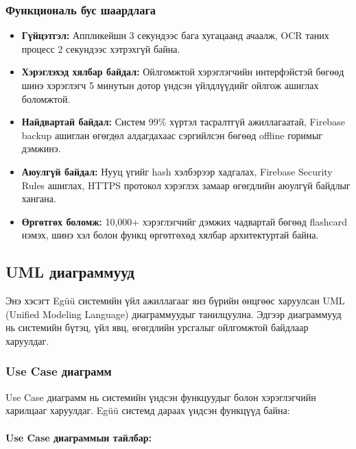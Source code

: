 \subsubsection{Функциональ бус шаардлага}

\begin{itemize}
\item \textbf{Гүйцэтгэл:} Аппликейшн 3 секундээс бага хугацаанд ачаалж, OCR таних процесс 2 секундээс хэтрэхгүй байна.

\item \textbf{Хэрэглэхэд хялбар байдал:} Ойлгомжтой хэрэглэгчийн интерфэйстэй бөгөөд шинэ хэрэглэгч 5 минутын дотор үндсэн үйлдлүүдийг ойлгож ашиглах боломжтой.

\item \textbf{Найдвартай байдал:} Систем 99\% хүртэл тасралтгүй ажиллагаатай, Firebase backup ашиглан өгөгдөл алдагдахаас сэргийлсэн бөгөөд offline горимыг дэмжинэ.

\item \textbf{Аюулгүй байдал:} Нууц үгийг hash хэлбэрээр хадгалах, Firebase Security Rules ашиглах, HTTPS протокол хэрэглэх замаар өгөгдлийн аюулгүй байдлыг хангана.

\item \textbf{Өргөтгөх боломж:} 10,000+ хэрэглэгчийг дэмжих чадвартай бөгөөд flashcard нэмэх, шинэ хэл болон функц өргөтгөхөд хялбар архитектуртай байна.
\end{itemize}

\subsection{UML диаграммууд}
\label{subsec:uml-diagrams}

Энэ хэсэгт Egüü системийн үйл ажиллагааг янз бүрийн өнцгөөс харуулсан UML (Unified Modeling Language) диаграммуудыг танилцуулна. Эдгээр диаграммууд нь системийн бүтэц, үйл явц, өгөгдлийн урсгалыг ойлгомжтой байдлаар харуулдаг.

\subsubsection{Use Case диаграмм}

Use Case диаграмм нь системийн үндсэн функцуудыг болон хэрэглэгчийн харилцааг харуулдаг. Egüü системд дараах үндсэн функцүүд байна:

\figUseCaseDiagram

\paragraph{Use Case диаграммын тайлбар:}

